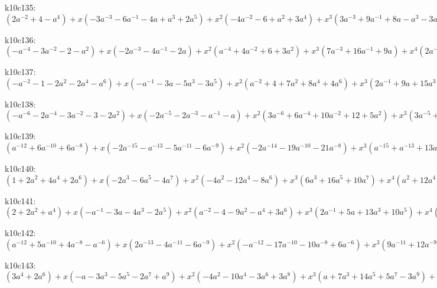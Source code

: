 k10c135: $ (2a^{-2}+4-a^{4}) +x(-3a^{-3}-6a^{-1}-4a+a^{3}+2a^{5}) +x^{2}(-4a^{-2}-6+a^{2}+3a^{4}) +x^{3}(3a^{-3}+9a^{-1}+8a-a^{3}-3a^{5}) +x^{4}(2a^{-2}+3-4a^{2}-5a^{4}) +x^{5}(-4a^{-1}-8a-3a^{3}+a^{5}) +x^{6}(a^{-2}+a^{2}+2a^{4}) +x^{7}(2a^{-1}+4a+2a^{3}) +x^{8}(1+a^{2}) $

k10c136: $ (-a^{-4}-3a^{-2}-2-a^{2}) +x(-2a^{-3}-4a^{-1}-2a) +x^{2}(a^{-4}+4a^{-2}+6+3a^{2}) +x^{3}(7a^{-3}+16a^{-1}+9a) +x^{4}(2a^{-2}-2-4a^{2}) +x^{5}(-5a^{-3}-14a^{-1}-9a) +x^{6}(-4a^{-2}-3+a^{2}) +x^{7}(a^{-3}+3a^{-1}+2a) +x^{8}(a^{-2}+1) $

k10c137: $ (-a^{-2}-1-2a^{2}-2a^{4}-a^{6}) +x(-a^{-1}-3a-5a^{3}-3a^{5}) +x^{2}(a^{-2}+4+7a^{2}+8a^{4}+4a^{6}) +x^{3}(2a^{-1}+9a+15a^{3}+8a^{5}) +x^{4}(-2-5a^{2}-7a^{4}-4a^{6}) +x^{5}(-7a-15a^{3}-8a^{5}) +x^{6}(1-a^{2}-a^{4}+a^{6}) +x^{7}(2a+4a^{3}+2a^{5}) +x^{8}(a^{2}+a^{4}) $

k10c138: $ (-a^{-6}-2a^{-4}-3a^{-2}-3-2a^{2}) +x(-2a^{-5}-2a^{-3}-a^{-1}-a) +x^{2}(3a^{-6}+6a^{-4}+10a^{-2}+12+5a^{2}) +x^{3}(3a^{-5}+5a^{-3}+8a^{-1}+6a) +x^{4}(-5a^{-4}-13a^{-2}-12-4a^{2}) +x^{5}(a^{-5}-6a^{-3}-14a^{-1}-7a) +x^{6}(3a^{-4}+3a^{-2}+1+a^{2}) +x^{7}(3a^{-3}+5a^{-1}+2a) +x^{8}(a^{-2}+1) $

k10c139: $ (a^{-12}+6a^{-10}+6a^{-8}) +x(-2a^{-15}-a^{-13}-5a^{-11}-6a^{-9}) +x^{2}(-2a^{-14}-19a^{-10}-21a^{-8}) +x^{3}(a^{-15}+a^{-13}+13a^{-11}+13a^{-9}) +x^{4}(a^{-14}+20a^{-10}+21a^{-8}) +x^{5}(-7a^{-11}-7a^{-9}) +x^{6}(-8a^{-10}-8a^{-8}) +x^{7}(a^{-11}+a^{-9}) +x^{8}(a^{-10}+a^{-8}) $

k10c140: $ (1+2a^{2}+4a^{4}+2a^{6}) +x(-2a^{3}-6a^{5}-4a^{7}) +x^{2}(-4a^{2}-12a^{4}-8a^{6}) +x^{3}(6a^{3}+16a^{5}+10a^{7}) +x^{4}(a^{2}+12a^{4}+11a^{6}) +x^{5}(-5a^{3}-11a^{5}-6a^{7}) +x^{6}(-6a^{4}-6a^{6}) +x^{7}(a^{3}+2a^{5}+a^{7}) +x^{8}(a^{4}+a^{6}) $

k10c141: $ (2+2a^{2}+a^{4}) +x(-a^{-1}-3a-4a^{3}-2a^{5}) +x^{2}(a^{-2}-4-9a^{2}-a^{4}+3a^{6}) +x^{3}(2a^{-1}+5a+13a^{3}+10a^{5}) +x^{4}(3+8a^{2}+a^{4}-4a^{6}) +x^{5}(-3a-12a^{3}-9a^{5}) +x^{6}(-4a^{2}-3a^{4}+a^{6}) +x^{7}(a+3a^{3}+2a^{5}) +x^{8}(a^{2}+a^{4}) $

k10c142: $ (a^{-12}+5a^{-10}+4a^{-8}-a^{-6}) +x(2a^{-13}-4a^{-11}-6a^{-9}) +x^{2}(-a^{-12}-17a^{-10}-10a^{-8}+6a^{-6}) +x^{3}(9a^{-11}+12a^{-9}+3a^{-7}) +x^{4}(a^{-12}+15a^{-10}+9a^{-8}-5a^{-6}) +x^{5}(-5a^{-11}-9a^{-9}-4a^{-7}) +x^{6}(-6a^{-10}-5a^{-8}+a^{-6}) +x^{7}(a^{-11}+2a^{-9}+a^{-7}) +x^{8}(a^{-10}+a^{-8}) $

k10c143: $ (3a^{4}+2a^{6}) +x(-a-3a^{3}-5a^{5}-2a^{7}+a^{9}) +x^{2}(-4a^{2}-10a^{4}-3a^{6}+3a^{8}) +x^{3}(a+7a^{3}+14a^{5}+5a^{7}-3a^{9}) +x^{4}(3a^{2}+11a^{4}+2a^{6}-6a^{8}) +x^{5}(-3a^{3}-10a^{5}-6a^{7}+a^{9}) +x^{6}(-4a^{4}-2a^{6}+2a^{8}) +x^{7}(a^{3}+3a^{5}+2a^{7}) +x^{8}(a^{4}+a^{6}) $

